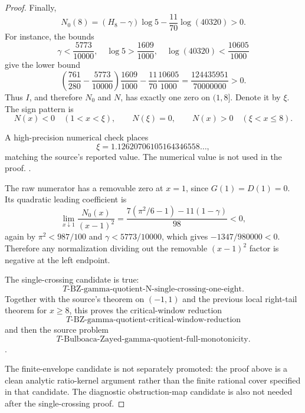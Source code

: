 \begin{proof}
Finally,
\[
N_0(8)=(H_8-\gamma)\log5-\frac{11}{70}\log(40320)>0.
\]
For instance, the bounds
\[
\gamma<\frac{5773}{10000},\quad \log5>\frac{1609}{1000},
\quad \log(40320)<\frac{10605}{1000}
\]
give the lower bound
\[
\left(\frac{761}{280}-\frac{5773}{10000}\right)\frac{1609}{1000}
-\frac{11}{70}\frac{10605}{1000}
=\frac{124435951}{70000000}>0.
\]
Thus \(I\), and therefore \(N_0\) and \(N\), has exactly one zero on
\((1,8]\).  Denote it by \(\xi\).  The sign pattern is
\[
N(x)<0\quad(1<x<\xi),\qquad
N(\xi)=0,\qquad
N(x)>0\quad(\xi<x\le8).
\]

A high-precision numerical check places
\[
\xi=1.12620706105164346558\ldots,
\]
matching the source's reported value.  The numerical value is not used in the
proof. \cite{app-app-0009-source}.

The raw numerator has a removable zero at \(x=1\), since \(G(1)=D(1)=0\).  Its
quadratic leading coefficient is
\[
\lim_{x\downarrow1}\frac{N_0(x)}{(x-1)^2}
=
\frac{7(\pi^2/6-1)-11(1-\gamma)}{98}<0,
\]
again by \(\pi^2<987/100\) and \(\gamma<5773/10000\), which gives
\(-1347/980000<0\).  Therefore any normalization dividing out the removable
\((x-1)^2\) factor is negative at the left endpoint.

The single-crossing candidate is true:
\[
T\text{-BZ-gamma-quotient-N-single-crossing-one-eight}.
\]
Together with the source's theorem on \((-1,1)\) and the previous local
right-tail theorem for \(x\ge8\), this proves the critical-window reduction
\[
T\text{-BZ-gamma-quotient-critical-window-reduction}
\]
and then the source problem
\[
T\text{-Bulboaca-Zayed-gamma-quotient-full-monotonicity}.
\] \cite{app-app-0009-source}.

The finite-envelope candidate is not separately promoted: the proof above is a
clean analytic ratio-kernel argument rather than the finite rational cover
specified in that candidate.  The diagnostic obstruction-map candidate is also
not needed after the single-crossing proof.
\end{proof}

